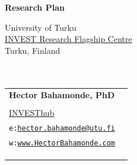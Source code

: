 \documentclass[letterpaper]{article}
\def\name{Research Plan}
\begin{document}

\centerline{\huge \bf \name}



\vspace{0.25in}

\begin{minipage}{0.45\linewidth}
 University of Turku \\
 \href{https://invest.utu.fi}{INVEST Research Flagship Centre} \\
  Turku, Finland\\
  \\
  \\

\end{minipage}
\hspace{4cm}\begin{minipage}{0.45\linewidth}
  \begin{tabular}{ll}
{\bf Hector Bahamonde, PhD}\\
{\color{blue}{\bf Senior Researcher}}\\
\href{https://invest.utu.fi/welfare-research-and-ecosystem/investhub/}{INVESThub}\\%
 \texttt{e:}\href{mailto:hector.bahamonde@utu.fi}{\texttt{hector.bahamonde@utu.fi}}   \\
 \texttt{w:}\href{http://www.hectorbahamonde.com}{\texttt{www.HectorBahamonde.com}}   \\
    \\
    \\
    \\
  \end{tabular}
\end{minipage}

\end{document}
